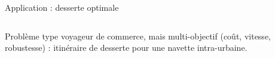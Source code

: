 \documentclass{beamer}
\begin{document}
\begin{frame}{}
\begin{columns}[t]
      
      \begin{column}{.49\textwidth}
      
       \begin{block}{Application : desserte optimale}
        \vspace{-1.5cm}
          \begin{columns}[t]
        \begin{column}{.95\textwidth}
       \begin{justify} Problème type voyageur de commerce, mais multi-objectif (coût, vitesse, robustesse) : itinéraire de desserte pour une navette intra-urbaine. 
       \end{justify}
         
         \bigskip\bigskip
          

\end{column}
\end{columns}
\end{block}
\end{column}
\end{columns}
\end{frame}
\end{document}

